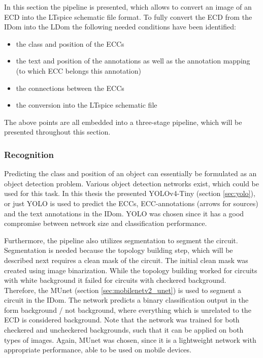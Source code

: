 In this section the pipeline is presented, which allows to convert an image of an \ac{ECD} into the LTspice schematic file format.
To fully convert the \ac{ECD} from the \ac{IDom} into the \ac{LDom} the following needed conditions have been identified:

\begin{itemize}
    \item the class and position of the \acp{ECC}
    \item the text and position of the annotations as well as the annotation mapping (to which \ac{ECC} belongs this annotation)
    \item the connections between the \acp{ECC}
    \item the conversion into the LTspice schematic file
\end{itemize}

The above points are all embedded into a three-stage pipeline, which will be presented throughout this section.

\subsubsection{Recognition}

Predicting the class and position of an object can essentially be formulated as an object detection problem.
Various object detection networks exist, which could be used for this task.
In this thesis the presented \ac{YOLOv4}-Tiny (section \ref{sec:yolo}), or just \ac{YOLO} is used to predict the \acp{ECC}, \ac{ECC}-annotations (arrows for sources) and the text annotations in the \ac{IDom}.
\ac{YOLO} was chosen since it has a good compromise between network size and classification performance.

Furthermore, the pipeline also utilizes segmentation to segment the circuit.
Segmentation is needed because the topology building step, which will be described next requires a clean mask of the circuit.
The initial clean mask was created using image binarization.
While the topology building worked for circuits with white background it failed for circuits with checkered background.
Therefore, the \ac{MUnet} (section \ref{sec:mobilenetv2_unet}) is used to segment a circuit in the \ac{IDom}.
The network predicts a binary classification output in the form background / not background, where everything which is unrelated to the \ac{ECD} is considered background.
Note that the network was trained for both checkered and uncheckered backgrounds, such that it can be applied on both types of images.
Again, \ac{MUnet} was chosen, since it is a lightweight network with appropriate performance, able to be used on mobile devices.

